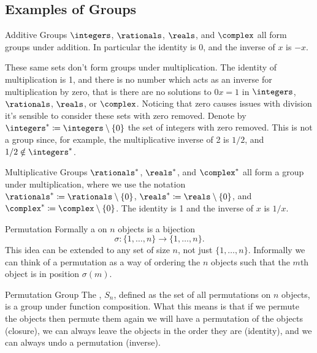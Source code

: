 \subsection{Examples of Groups}
\begin{exm}{Additive Groups}{}
    \(\integers\), \(\rationals\), \(\reals\), and \(\complex\) all form groups under addition.
    In particular the identity is \(0\), and the inverse of \(x\) is \(-x\).
\end{exm}

These same sets don't form groups under multiplication.
The identity of multiplication is 1, and there is no number which acts as an inverse for multiplication by zero, that is there are no solutions to \(0x = 1\) in \(\integers\), \(\rationals\), \(\reals\), or \(\complex\).
Noticing that zero causes issues with division it's sensible to consider these sets with zero removed.
Denote by \(\integers^* \coloneqq \integers \setminus \{0\}\) the set of integers with zero removed.
This is not a group since, for example, the multiplicative inverse of 2 is \(1/2\), and \(1/2 \notin \integers^*\).

\begin{exm}{Multiplicative Groups}{}
    \(\rationals^*\), \(\reals^*\), and \(\complex^*\) all form a group under multiplication, where we use the notation \(\rationals^* \coloneqq \rationals \setminus \{0\}\), \(\reals^* \coloneqq \reals \setminus \{0\}\), and \(\complex^* \coloneqq \complex \setminus \{0\}\).
    The identity is 1 and the inverse of \(x\) is \(1/x\).
\end{exm}

\begin{dfn}{Permutation}{}
    Formally a  on \(n\) objects is a bijection
    \begin{equation}
        \sigma \colon \{1, \dotsc, n\} \to \{1, \dotsc, n\}.
    \end{equation}
    This idea can be extended to any set of size \(n\), not just \(\{1, \dotsc, n\}\).
    Informally we can think of a permutation as a way of ordering the \(n\) objects such that the \(m\)th object is in position \(\sigma(m)\).
\end{dfn}

\begin{exm}{Permutation Group}{}
    The , \(S_n\), defined as the set of all permutations on \(n\) objects, is a group under function composition.
    What this means is that if we permute the objects then permute them again we will have a permutation of the objects (closure), we can always leave the objects in the order they are (identity), and we can always undo a permutation (inverse).
\end{exm}

